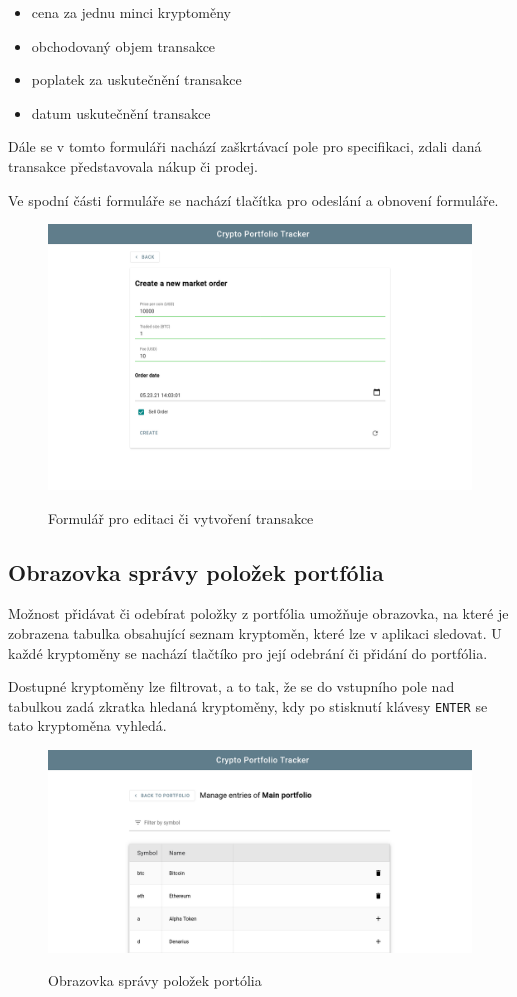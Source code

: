 \documentclass[12pt, a4paper]{article}
\begin{document}
    \begin{itemize}
        \item cena za jednu minci kryptoměny
        \item obchodovaný objem transakce
        \item poplatek za uskutečnění transakce
        \item datum uskutečnění transakce
    \end{itemize}
    Dále se v tomto formuláři nachází zaškrtávací pole pro specifikaci, zdali daná transakce představovala nákup či prodej.
    
    Ve spodní části formuláře se nachází tlačítka pro odeslání a obnovení formuláře.

    \begin{figure}[!ht]
        \centering
        {\includegraphics[width=\textwidth]{img/cpt-screenshots/order-form.png}}
        \caption{Formulář pro editaci či vytvoření transakce}
        \label{fig:transaction-form}
    \end{figure}

    \subsection{Obrazovka správy položek portfólia}
    Možnost přidávat či odebírat položky z portfólia umožňuje obrazovka, na které je zobrazena tabulka obsahující seznam
    kryptoměn, které lze v aplikaci sledovat.
    U každé kryptoměny se nachází tlačtíko pro její odebrání či přidání do portfólia.
    
    Dostupné kryptoměny lze filtrovat, a to tak, že se do vstupního pole nad tabulkou zadá zkratka hledaná kryptoměny, kdy po stisknutí klávesy \texttt{ENTER} se tato kryptoměna vyhledá.

    \begin{figure}[!ht]
        \centering
        {\includegraphics[width=\textwidth]{img/cpt-screenshots/portfolio-entry-mngmt.png}}
        \caption{Obrazovka správy položek portólia}
        \label{fig:portfolio-entry-mngmnt}
    \end{figure}

    \printbibliography
\end{document}
